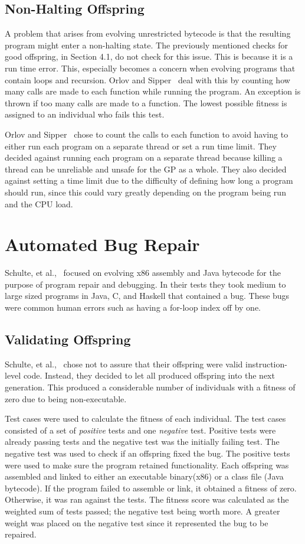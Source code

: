 \documentclass{sig-alternate}
\begin{document}
\subsection{Non-Halting Offspring}
A problem that arises from evolving unrestricted bytecode is that the resulting program might enter a non-halting state. The previously mentioned checks for good offspring, in Section 4.1, do not check for this issue. This is because it is a run time error. This, especially becomes a concern when evolving programs that contain loops and recursion.
Orlov and Sipper~\cite{FINCH:2011} deal with this by counting how many calls are made to each function while running the program. An exception is thrown if too many calls are made to a function. The lowest possible fitness is assigned to an individual who fails this test.\par

Orlov and Sipper~\cite{FINCH:2011} chose to count the calls to each function to avoid having to either run each program on a separate thread or set a run time limit. They decided against running each program on a separate thread because killing a thread can be unreliable and unsafe for the GP as a whole. They also decided against setting a time limit due to the difficulty of defining how long a program should run, since this could vary greatly depending on the program being run and the CPU load.


\section{Automated Bug Repair}
Schulte, et al.,~\cite{Assembly:2010} focused on evolving x86 assembly and Java bytecode for the purpose of program repair and debugging. In their tests they took medium to large sized programs in Java, C, and Haskell that contained a bug. These bugs were common human errors such as having a for-loop index off by one. 
\subsection{Validating Offspring} 
Schulte, et al.,~\cite{Assembly:2010} chose not to assure that their offspring were valid instruction-level code. Instead, they decided to let all produced offspring into the next generation. This produced a considerable number of individuals with a fitness of zero due to being non-executable.

Test cases were used to calculate the fitness of each individual. The test cases consisted of a set of \textit{positive} tests and one \textit{negative} test. Positive tests were already passing tests and the negative test was the initially failing test. The negative test was used to check if an offspring fixed the bug. The positive tests were used to make sure the program retained functionality. Each offspring was assembled and linked to either an executable binary(x86) or a class file (Java bytecode). If the program failed to assemble or link, it obtained a fitness of zero. Otherwise, it was ran against the tests. The fitness score was calculated as the weighted sum of tests passed; the negative test being worth more. A greater weight was placed on the negative test since it represented the bug to be repaired.
\end{document}
